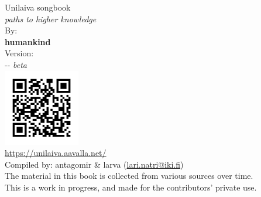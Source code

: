\documentclass[twoside,10pt]{book}
\begin{document}
  \begin{titlepage}
    
    \thispagestyle{empty}
    \vspace*{\fill}
    \begin{center}
      \Huge Unilaiva songbook\\
      \normalsize \textit{paths to higher knowledge}\\
      \Large
      \vspace{3em}
      By:\\
      \textbf{humankind}\\
      \vspace{1em}
      Version:\\
      \the\year-\the\month-\the\day \textit{ beta}
      \\
      \vspace*{\fill}
      \includegraphics[width=0.25\textwidth]{QR_https_unilaiva_aavalla_net.png}
      \\
      {\small\url{https://unilaiva.aavalla.net/}}
      \\
      \vspace*{\fill}
      {\footnotesize Compiled by: antagomir \& larva (\href{mailto:lari.natri@iki.fi}{lari.natri@iki.fi})}
      \\
      \vspace{1.5em}
      {\scriptsize
        The material in this book is collected from various sources over time.\\
        \vspace{-1em} %
        This is a work in progress, and made for the contributors' private use.
        \vspace{-1em} %
      }
    \end{center}
  \end{titlepage}

  \tableofcontents %

  \clearpage\scleardpage
\end{document}
